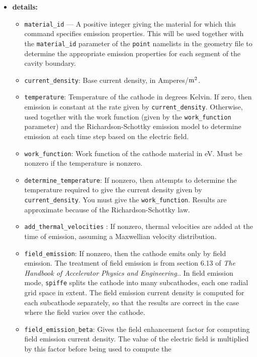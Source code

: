 \begin{itemize}
\item {\bf details:} 
\begin{itemize}
        \item {\tt material\_id} --- A positive integer giving the material for which this
          command specifies emission properties. This will be used together with
          the \verb|material_id| parameter of the \verb|point| namelists in the geometry
          file to determine the appropriate emission properties for each segment
          of the cavity boundary.
    \item {\tt current\_density}: Base current density, in Amperes/${\rm m^2}$.
    \item {\tt temperature}: Temperature of the cathode in degrees Kelvin.  If
        zero, then emission is constant at the rate given by {\tt current\_density}.
        Otherwise, used together with the work function (given by the
        {\tt work\_function} parameter) and the Richardson-Schottky emission model
        to determine emission at each time step based on the electric field.
    \item {\tt work\_function}: Work function of the cathode material in eV.  Must
        be nonzero if the temperature is nonzero.
    \item {\tt determine\_temperature}: If nonzero, then attempts to determine the      
        temperature required to give the current density given by {\tt current\_density}.
        You must give the {\tt work\_function}.  Results are approximate because
        of the Richardson-Schottky law.
      \item {\tt add\_thermal\_velocities} : If nonzero, thermal velocities are
        added at the time of emission, assuming a Maxwellian velocity distribution.
    \item {\tt field\_emission}: If nonzero, then the cathode emits only by field
        emission.  The treatment of field emission is from section 6.13 of {\em
        The Handbook of Accelerator Physics and Engineering.}.  In field emission
        mode, {\tt spiffe} splits the cathode into many subcathodes, each one
        radial grid space in extent.  The field emission current density is
        computed for each subcathode separately, so that the results are correct
        in the case where the field varies over the cathode.
    \item {\tt field\_emission\_beta}: Gives the field enhancement factor for
        computing field emission current density.  The value of the electric
        field is multiplied by this factor before being used to compute the

\end{itemize}
\end{itemize}
